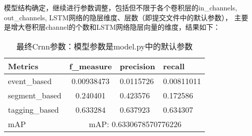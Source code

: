 \documentclass[]{ctexart}
\begin{document}
模型结构确定，继续进行参数调整，包括但不限于各个卷积层的in\_channels, out\_channels, LSTM网络的隐层维度、层数（即提交文件中的默认参数），
主要是增大卷积层channel的个数和LSTM网络隐层向量的维度，结果如下：
\begin{table}[ht]
    \centering
    \begin{tabular}{|l|cll|}
    \hline
    Metrics        & \multicolumn{1}{c|}{f\_measure} & \multicolumn{1}{l|}{precision}  & recall     \\ \hline
    event\_based   & \multicolumn{1}{c|}{0.00938473} & \multicolumn{1}{l|}{0.0115726}  & 0.00811011 \\ \hline
    segment\_based & \multicolumn{1}{c|}{0.240401}   & \multicolumn{1}{l|}{0.423576}   & 0.172586   \\ \hline
    tagging\_based & \multicolumn{1}{c|}{0.633284}   & \multicolumn{1}{l|}{0.637923}   & 0.634307   \\ \hline
    mAP            & \multicolumn{3}{c|}{mAP: 0.6330678570776226}                                        \\ \hline
    \end{tabular}
    \caption{最终Crnn参数：模型参数是model.py中的默认参数}
    \label{exp4}
\end{table}
\end{document}
